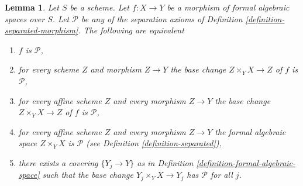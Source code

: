 \documentclass{stacks-project}
\theoremstyle{plain}
\newtheorem{lemma}[subsection]{Lemma}
\theoremstyle{definition}
\theoremstyle{remark}
\numberwithin{equation}{subsection}
\begin{document}
\begin{lemma}
\label{lemma-separated-local}
Let $S$ be a scheme. Let $f : X \to Y$ be a morphism of formal algebraic spaces
over $S$. Let $\mathcal{P}$ be any of the separation axioms of
Definition \ref{definition-separated-morphism}.
The following are equivalent
\begin{enumerate}
\item $f$ is $\mathcal{P}$,
\item for every scheme $Z$ and morphism $Z \to Y$ the
base change $Z \times_Y X \to Z$ of $f$ is $\mathcal{P}$,
\item for every affine scheme $Z$ and every morphism $Z \to Y$ the
base change $Z \times_Y X \to Z$ of $f$ is $\mathcal{P}$,
\item for every affine scheme $Z$ and every morphism $Z \to Y$ the
formal algebraic space $Z \times_Y X$ is $\mathcal{P}$ (see
Definition \ref{definition-separated}),
\item there exists a covering $\{Y_j \to Y\}$ as in
Definition \ref{definition-formal-algebraic-space}
such that the base change $Y_j \times_Y X \to Y_j$ has
$\mathcal{P}$ for all $j$.
\end{enumerate}
\end{lemma}
\end{document}

